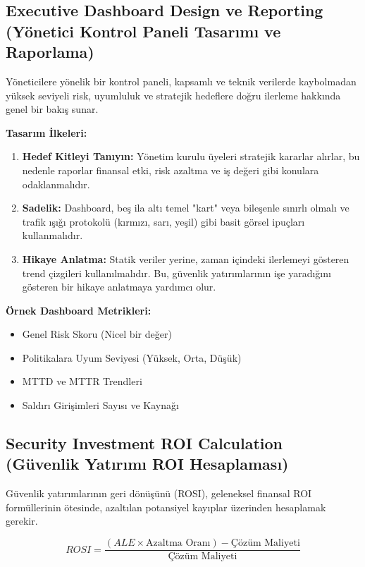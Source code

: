\subsection{Executive Dashboard Design ve Reporting (Yönetici Kontrol Paneli Tasarımı ve Raporlama)}

Yöneticilere yönelik bir kontrol paneli, kapsamlı ve teknik verilerde kaybolmadan yüksek seviyeli risk, uyumluluk ve stratejik hedeflere doğru ilerleme hakkında genel bir bakış sunar.

\textbf{Tasarım İlkeleri:}
\begin{enumerate}
    \item \textbf{Hedef Kitleyi Tanıyın:} Yönetim kurulu üyeleri stratejik kararlar alırlar, bu nedenle raporlar finansal etki, risk azaltma ve iş değeri gibi konulara odaklanmalıdır.
    \item \textbf{Sadelik:} Dashboard, beş ila altı temel "kart" veya bileşenle sınırlı olmalı ve trafik ışığı protokolü (kırmızı, sarı, yeşil) gibi basit görsel ipuçları kullanmalıdır.
    \item \textbf{Hikaye Anlatma:} Statik veriler yerine, zaman içindeki ilerlemeyi gösteren trend çizgileri kullanılmalıdır. Bu, güvenlik yatırımlarının işe yaradığını gösteren bir hikaye anlatmaya yardımcı olur.
\end{enumerate}

\textbf{Örnek Dashboard Metrikleri:}
\begin{itemize}
    \item Genel Risk Skoru (Nicel bir değer)
    \item Politikalara Uyum Seviyesi (Yüksek, Orta, Düşük)
    \item MTTD ve MTTR Trendleri
    \item Saldırı Girişimleri Sayısı ve Kaynağı
\end{itemize}

\subsection{Security Investment ROI Calculation (Güvenlik Yatırımı ROI Hesaplaması)}

Güvenlik yatırımlarının geri dönüşünü (ROSI), geleneksel finansal ROI formüllerinin ötesinde, azaltılan potansiyel kayıplar üzerinden hesaplamak gerekir.

\begin{equation}
ROSI = \frac{(ALE \times \text{Azaltma Oranı}) - \text{Çözüm Maliyeti}}{\text{Çözüm Maliyeti}}
\end{equation}

